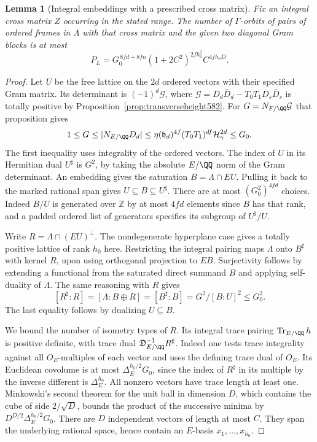 \documentclass[a4paper,11pt]{article}
\newtheorem{lemma}[proposition]{Lemma}
\theoremstyle{definition}
\theoremstyle{remark}
\numberwithin{equation}{section}
\begin{document}
\begin{lemma}[Integral embeddings with a prescribed cross matrix]
\leavevmode\label{lem:smallglue591}
Fix an integral cross matrix \(Z\) occurring in the stated
range. The number of \(\Gamma\)-orbits of pairs of ordered
frames in \(\Lambda\) with that cross matrix and the given
two diagonal Gram blocks is at most
\[
 P_L=G_0^{\,8fd+8fn}
       (1+2C^2)^{2fh_0^2} C^{4fh_0D}.
\]
\end{lemma}
\begin{proof}
Let \(U\) be the free lattice on the \(2d\) ordered vectors
with their specified Gram matrix. Its determinant is
\((-1)^d\mathcal G\), where
\(\mathcal G=D_d\bar D_d-T_0T_1D_s\bar D_s\) is totally
positive by Proposition~\ref{prop:transverseheight582}.
For \(G=N_{F/\QQ}\mathcal G\) that proposition gives
\[
  1\le G\le |N_{E/\QQ}D_d|
       \le\eta(\mathfrak h_d)^{4f}(T_0T_1)^{df}
                               \mathcal H_\gamma^{2d}\le G_0 .
\]
The first inequality uses integrality of the ordered vectors.
The index of \(U\) in its Hermitian dual \(U^\sharp\) is \(G^2\),
by taking the absolute \(E/\QQ\) norm of the Gram determinant.
An embedding gives the saturation \(B=\Lambda\cap EU\).
Pulling it back to the marked rational span gives
\(U\subseteq B\subseteq U^\sharp\). There are at most
\((G_0^2)^{4fd}\) choices. Indeed \(B/U\) is generated
over \(\mathbb Z\) by at most \(4fd\) elements since \(B\) has
that rank, and a padded ordered list of generators specifies
its subgroup of \(U^\sharp/U\).

Write \(R=\Lambda\cap(EU)^\perp\). The nondegenerate
hyperplane case gives a totally positive lattice of rank
\(h_0\) here. Restricting the integral pairing maps
\(\Lambda\) onto \(B^\sharp\) with kernel \(R\), upon using
orthogonal projection to \(EB\). Surjectivity follows by
extending a functional from the saturated direct summand
\(B\) and applying self-duality of \(\Lambda\). The same
reasoning with \(R\) gives
\[
 [R^\sharp:R]=[\Lambda:B\oplus R]
          =[B^\sharp:B]=G^2/[B:U]^2\le G_0^2 .
\]
The last equality follows by dualizing \(U\subseteq B\).

We bound the number of isometry types of \(R\).
Its integral trace pairing \(\operatorname{Tr}_{E/\QQ}h\)
is positive definite, with trace dual
\(\mathfrak D_{E/\QQ}^{-1}R^\sharp\). Indeed one tests trace
integrality against all \(O_E\)-multiples of each vector and
uses the defining trace dual of \(O_E\). Its Euclidean
covolume is at most \(\Delta_E^{h_0/2}G_0\), since the
index of \(R^\sharp\) in its multiple by the inverse
different is \(\Delta_E^{h_0}\). All nonzero vectors have
trace length at least one. Minkowski's second theorem for the
unit ball in dimension \(D\), which contains the cube of
side \(2/\sqrt D\), bounds the product of the successive
minima by \(D^{D/2}\Delta_E^{h_0/2}G_0\).
There are \(D\) independent vectors of length at most \(C\).
They span the underlying rational space, hence contain an
\(E\)-basis \(x_1,\ldots,x_{h_0}\).


\end{proof}
\end{document}
